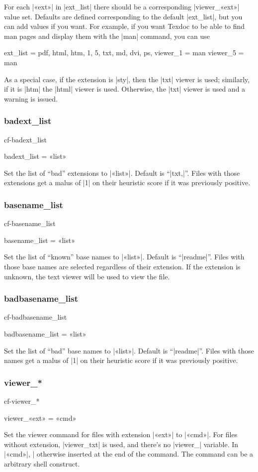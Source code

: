 \documentclass[a4paper, oneside]{scrartcl}
\makeatletter
\newif\ifframed
\newenvironment{cmdsubsub}[2]{%
  \framedfalse \commandes\subsubsection{#1}{#2}%
  }{%
  \endcommandes}
\newenvironment{htcode}{%
  \SaveVerbatim[samepage, gobble=2]{verbmat}%
  }{%
  \endSaveVerbatim
  \par\medskip\noindent\hspace*{\parindent}%
  \BUseVerbatim{verbmat}%
  \par\medskip\@endpetrue}
\makeatother
\begin{document}
For each |«ext»| in |ext_list| there should be a corresponding |viewer_«ext»|
value set.  Defaults are defined corresponding to the default |ext_list|, but
you can add values if you want.  For example, if you want Texdoc to be able
to find man pages and display them with the |man| command, you can use
\begin{htcode}
  ext_list = pdf, html, htm, 1, 5, txt, md, dvi, ps,
  viewer_1 = man
  viewer_5 = man
\end{htcode}

As a special case, if the extension is |sty|, then the |txt| viewer is used;
similarly, if it is |htm| the |html| viewer is used. Otherwise, the |txt|
viewer is used and a warning is issued.

\begin{cmdsubsub}{badext_list}{cf-badext_list}
  badext_list = «list»
\end{cmdsubsub}

Set the list of ``bad'' extensions to |«list»|.  Default is ``|txt,|''. Files
with those extensions get a malus of |1| on their heuristic score if it was
previously positive.

\begin{cmdsubsub}{basename_list}{cf-basename_list}
  basename_list = «list»
\end{cmdsubsub}

Set the list of ``known'' base names to |«list»|.  Default is ``|readme|''.
Files with those base names are selected regardless of their extension. If the
extension is unknown, the text viewer will be used to view the file.

\begin{cmdsubsub}{badbasename_list}{cf-badbasename_list}
  badbasename_list = «list»
\end{cmdsubsub}

Set the list of ``bad'' base names to |«list»|.  Default is ``|readme|''. Files
with those names get a malus of |1| on their heuristic score if it was
previously positive.

\begin{cmdsubsub}{viewer_*}{cf-viewer_*}
  viewer_«ext» = «cmd»
\end{cmdsubsub}

Set the viewer command for files with extension |«ext»| to |«cmd»|. For files
without extension, |viewer_txt| is used, and there's no |viewer_| variable.
In |«cmd»|, |%
otherwise inserted at the end of the command.  The command can be a arbitrary
shell construct.
\end{document}
